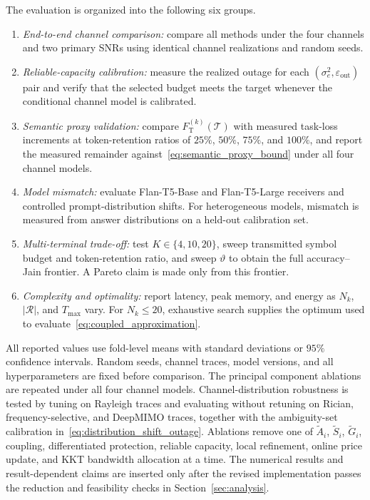 \documentclass[journal]{IEEEtran}
\begin{document}
The evaluation is organized into the following six groups.
\begin{enumerate}
\item \emph{End-to-end channel comparison:} compare all methods under the four channels and two primary SNRs using identical channel realizations and random seeds.
\item \emph{Reliable-capacity calibration:} measure the realized outage for each $(\sigma_e^2,\varepsilon_{\mathrm{out}})$ pair and verify that the selected budget meets the target whenever the conditional channel model is calibrated.
\item \emph{Semantic proxy validation:} compare $F_{\mathrm T}^{(k)}(\mathcal T)$ with measured task-loss increments at token-retention ratios of $25\%$, $50\%$, $75\%$, and $100\%$, and report the measured remainder against~\eqref{eq:semantic_proxy_bound} under all four channel models.
\item \emph{Model mismatch:} evaluate Flan-T5-Base and Flan-T5-Large receivers and controlled prompt-distribution shifts. For heterogeneous models, mismatch is measured from answer distributions on a held-out calibration set.
\item \emph{Multi-terminal trade-off:} test $K\in\{4,10,20\}$, sweep transmitted symbol budget and token-retention ratio, and sweep $\vartheta$ to obtain the full accuracy--Jain frontier. A Pareto claim is made only from this frontier.
\item \emph{Complexity and optimality:} report latency, peak memory, and energy as $N_k$, $|\mathcal R|$, and $T_{\max}$ vary. For $N_k\leq20$, exhaustive search supplies the optimum used to evaluate~\eqref{eq:coupled_approximation}.
\end{enumerate}

All reported values use fold-level means with standard deviations or $95\%$ confidence intervals. Random seeds, channel traces, model versions, and all hyperparameters are fixed before comparison. The principal component ablations are repeated under all four channel models. Channel-distribution robustness is tested by tuning on Rayleigh traces and evaluating without retuning on Rician, frequency-selective, and DeepMIMO traces, together with the ambiguity-set calibration in~\eqref{eq:distribution_shift_outage}. Ablations remove one of $\widetilde A_i$, $\widetilde S_i$, $\widetilde G_i$, coupling, differentiated protection, reliable capacity, local refinement, online price update, and KKT bandwidth allocation at a time. The numerical results and result-dependent claims are inserted only after the revised implementation passes the reduction and feasibility checks in Section~\ref{sec:analysis}.
\end{document}
